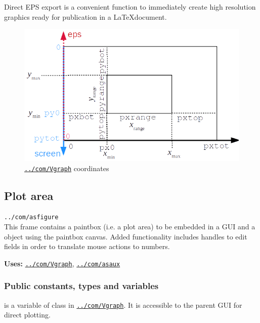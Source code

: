\documentclass[12pt]{article}
\newcommand\code[1]{{\tt #1}}
\newcommand\guifco[1]{{\color{violet}\code{#1}}}
\newcommand{\opaguif}[1]{\colorbox{violet!30}{\code{#1}}}
\newcommand{\oguifh}[2]{\subsection{\label{#2}#1}{\Huge\opaguif{#2}}\\}
\newcommand{\oguif}[1]{\hyperref[#1]{\opaguif{#1}}}
\newcommand{\opauni}[1]{\colorbox{orange!30}{\code{#1}}}
\newcommand{\ouni}[1]{\hyperref[#1]{\opauni{#1}}}
\newcommand{\uses}[1]{{\bf Uses: } #1}
\newcommand{\pvar}[1]{\subsubsection*{Public constants, types and variables} #1}
\newcommand{\feature}[1]{{\color{cadmiumgreen} #1}}
\begin{document}
\feature{Direct EPS export is a convenient function to immediately create high resolution graphics ready for publication in a \LaTeX document.}


\begin{figure}\centering
\includegraphics[scale=0.8]{vplotcoor.png}
\caption{\label{vprange}\oguif{../com/Vgraph} coordinates}
\end{figure}



\oguifh{Plot area}{../com/asfigure}
This frame contains a paintbox (i.e. a plot area) to be embedded in a GUI and a \guifco{Vplot} object using the paintbox canvas. 
Added functionality includes handles to edit fields in order to translate mouse actions to numbers. 

\uses{\oguif{../com/Vgraph}, \ouni{../com/asaux}}

\pvar{
\guifco{plot} is a variable of class \guifco{Vplot} in \oguif{../com/Vgraph}. It is accessible to the parent GUI for direct plotting.

}
\end{document}
